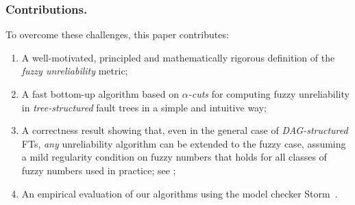 \documentclass[runningheads]{llncs}
\newcommand{\colorpar}[3]{\colorbox{#1}{\parbox{#2}{#3}}}
\newcommand{\marginremark}[3]{\marginpar{\colorpar{#2}{7em}{\color{#1}#3}}}
\newcommand{\ms}[1]{}
\newcommand{\ms}[1]{\marginremark{purple}{white}{\tiny{[MS]~ #1}}}
\renewcommand{\emph}[1]{{\it #1}}
\begin{document}



\subsubsection{Contributions.}
To overcome these challenges, this paper contributes:
\begin{enumerate}
    \item A well-motivated, principled and mathematically rigorous definition of the \emph{fuzzy unreliability} metric;
    \item A fast bottom-up algorithm based on \emph{$\alpha$-cuts} for computing fuzzy unreliability in \emph{tree-structured} fault trees in a simple and intuitive way;
    \item A correctness result showing that, even in the general case of \emph{DAG-structured} FTs, \emph{any} unreliability algorithm can be extended to the fuzzy case, assuming a mild regularity condition on fuzzy numbers that holds for all classes of fuzzy numbers used in practice; see ;
    \item An empirical evaluation of our algorithms using the model checker Storm~\cite{Hensel2022storm}.
\end{enumerate}
\end{document}
